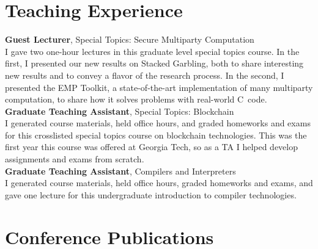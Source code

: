 \documentclass[11pt]{article}
\newcommand{\CC}{C\nolinebreak\hspace{-.05em}\raisebox{.4ex}{\tiny\bf +}\nolinebreak\hspace{-.10em}\raisebox{.4ex}{\tiny\bf +}}
\begin{document}
{\section*{Teaching Experience}

\textbf{Guest Lecturer}, Special Topics: Secure Multiparty Computation\\
I gave two one-hour lectures in this graduate level special topics course.
In the first, I presented our new results on Stacked Garbling, both to share interesting new results and to convey a flavor of the research process.
In the second, I presented the EMP Toolkit, a state-of-the-art implementation of many multiparty computation, to share
how it solves problems with real-world \CC\ code.
\medskip\\


\textbf{Graduate Teaching Assistant}, Special Topics: Blockchain\\
I generated course materials, held office hours, and graded homeworks and exams for this crosslisted special topics course on blockchain technologies.
This was the first year this course was offered at Georgia Tech, so as a TA I helped develop assignments and exams from scratch.
\medskip\\

\pagebreak
{}
\textbf{Graduate Teaching Assistant}, Compilers and Interpreters\\
I generated course materials, held office hours, graded homeworks and exams, and gave one lecture for this undergraduate introduction to compiler technologies.


\section*{Conference Publications}

\begin{description}
  \item {}
  \item
  \item

  \item {}
  \item
  \item
  \item
  \item
  \item
  \item


\end{description}}
\end{document}
